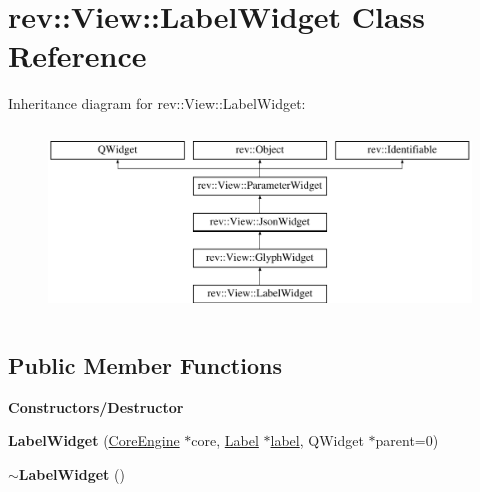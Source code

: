 \hypertarget{classrev_1_1_view_1_1_label_widget}{}\section{rev\+::View\+::Label\+Widget Class Reference}
\label{classrev_1_1_view_1_1_label_widget}
Inheritance diagram for rev\+::View\+::Label\+Widget\+:\begin{figure}[H]
\begin{center}
\leavevmode
\includegraphics[height=5.000000cm]{classrev_1_1_view_1_1_label_widget}
\end{center}
\end{figure}
\subsection*{Public Member Functions}
\begin{Indent}\textbf{ Constructors/\+Destructor}\par
\begin{DoxyCompactItemize}
\item 
\mbox{\label{classrev_1_1_view_1_1_label_widget_afa41a8abe10827835c6a59732ad4feac}} 
{\bfseries Label\+Widget} (\mbox{\hyperlink{classrev_1_1_core_engine}{Core\+Engine}} $\ast$core, \mbox{\hyperlink{classrev_1_1_label}{Label}} $\ast$\mbox{\hyperlink{classrev_1_1_view_1_1_label_widget_a59b1e1dc09ff7193011213917a0f60d4}{label}}, Q\+Widget $\ast$parent=0)
\item 
\mbox{\label{classrev_1_1_view_1_1_label_widget_a19b50f1ef0fe5c7cdc1a33b355daed7d}} 
{\bfseries $\sim$\+Label\+Widget} ()
\end{DoxyCompactItemize}
\end{Indent}
